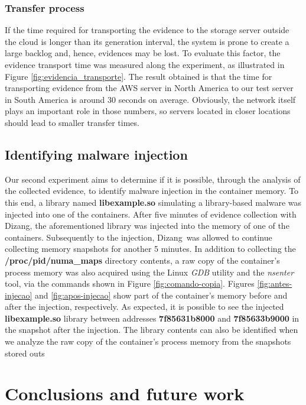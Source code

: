 \documentclass[twocolumn, notitlepage]{bmcart}%
\newcommand{\fancyname}{Dizang}
\begin{document}
\subsubsection*{Transfer process}
If the time required for transporting the evidence to the storage server outside the cloud is longer than its generation interval, the system is prone to create a large backlog and, hence, evidences may be lost.
%
To evaluate this factor, the evidence transport time was measured along the experiment, as illustrated in Figure \ref{fig:evidencia_transporte}.
%
The result obtained is that the time for transporting evidence from the AWS server in North America to our test server in South America is around 30 seconds on average.
%
Obviously, the network itself plays an important role in those numbers, so servers located in closer locations should lead to smaller transfer times.


\subsection*{Identifying malware injection}

Our second experiment aims to determine if it is possible, through the analysis of the collected evidence, to identify malware injection in the container memory.
%
To this end, a library named \textbf{libexample.so} simulating a library-based malware was injected into one of the containers.
%
After five minutes of evidence collection with \fancyname, the aforementioned library was injected into the memory of one of the containers. 
%
Subsequently to the injection, \fancyname\ was allowed to continue collecting memory snapshots for another 5 minutes.
%
In addition to collecting the \textbf{/proc/pid/numa\_maps} directory contents, a raw copy of the container's process memory was also acquired using the Linux \textit{GDB} utility and the \textit{nsenter} tool, via the commands shown in Figure \ref{fig:comando-copia}.
%
Figures \ref{fig:antes-injecao} and \ref{fig:apos-injecao} show part of the container's memory before and after the injection, respectively.
%
As expected, it is possible to see the injected \textbf{libexample.so} library between addresses \textbf{7f85631b8000} and \textbf{7f85633b9000} in the snapshot after the injection.
%
The library contents can also be identified when we analyze the raw copy of the container's process memory from the snapshots stored outs


\section*{Conclusions and future work}
\label{sec:conclusion}
\end{document}
